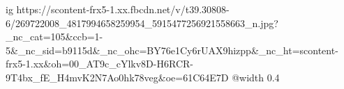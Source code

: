  
 
 
 
 

\ifcmt
  ig https://scontent-frx5-1.xx.fbcdn.net/v/t39.30808-6/269722008_4817994658259954_5915477256921558663_n.jpg?_nc_cat=105&ccb=1-5&_nc_sid=b9115d&_nc_ohc=BY76e1Cy6rUAX9hizpp&_nc_ht=scontent-frx5-1.xx&oh=00_AT9c_cYlkv8D-H6RCR-9T4bx_fE_H4mvK2N7Ao0hk78veg&oe=61C64E7D
  @width 0.4
\fi
